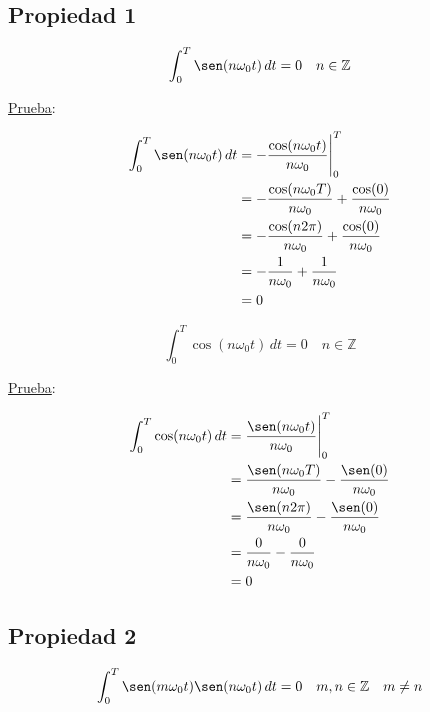 \subsection*{Propiedad 1}

\begin{equation}
    \int_{0}^{T}\sen(n\omega_0 t)\,dt=0\quad n\in\mathbb{Z}
\end{equation}

\underline{Prueba}:

\begin{equation*}
\begin{split}
    \int_{0}^{T}\sen(n\omega_0 t)\,dt
        &=-\frac{\cos(n\omega_0 t)}{n\omega_0}\Biggr|_{0}^{T}\\
        &=-\frac{\cos(n\omega_0 T)}{n\omega_0}+\frac{\cos(0)}{n\omega_0}\\
        &=-\frac{\cos(n 2\pi)}{n\omega_0}+\frac{\cos(0)}{n\omega_0}\\
        &=-\frac{1}{n\omega_0}+\frac{1}{n\omega_0}\\
        &=0\\
\end{split}
\end{equation*}

\begin{equation}
    \int_{0}^{T}\cos(n\omega_0 t)\,dt=0\quad n\in\mathbb{Z}
\end{equation}

\underline{Prueba}:

\begin{equation*}
\begin{split}
    \int_{0}^{T}\cos(n\omega_0 t)\,dt
        &=\frac{\sen(n\omega_0 t)}{n\omega_0}\Biggr|_{0}^{T}\\
        &=\frac{\sen(n\omega_0 T)}{n\omega_0}-\frac{\sen(0)}{n\omega_0}\\
        &=\frac{\sen(n 2\pi)}{n\omega_0}-\frac{\sen(0)}{n\omega_0}\\
        &=\frac{0}{n\omega_0}-\frac{0}{n\omega_0}\\
        &=0\\
\end{split}
\end{equation*}

\subsection*{Propiedad 2}

\begin{equation}
    \int_{0}^{T}\sen(m\omega_0 t)\sen(n\omega_0 t)\,dt=0
    \quad m,n \in\mathbb{Z}\quad m\neq n
\end{equation}

